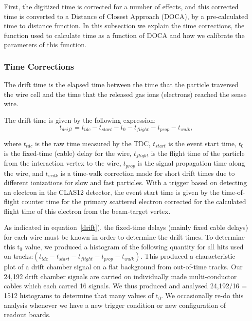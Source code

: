 First, the digitized time is corrected for a number
of effects, and this corrected time is converted to a Distance of Closest Approach (DOCA), by 
a pre-calculated time to distance function.  In this subsection we 
explain the time corrections, the function used to calculate time as a 
function of DOCA and how we calibrate the parameters of this function.

\subsubsection{Time Corrections}
The drift time is the elapsed time between the time that the particle 
traversed the wire cell and the time that the released gas ions (electrons)
reached the sense wire.

The drift time is given by the following expression:
\begin{equation} 
\label{drift}
t_{drift} = t_{tdc} - t_{start} - t_{0} - t_{flight} - t_{prop} - t_{walk},
\end{equation}

\noindent
where $t_{tdc}$ is the raw time measured by the TDC, $t_{start}$ is the event start time, 
$t_0$ is the fixed-time (cable) delay for the wire, $t_{flight}$ is the 
flight time of the particle from the interaction vertex to the wire, $t_{prop}$ 
is the signal propagation time along the wire, and $t_{walk}$ is a time-walk 
correction made for short drift times due to different ionizations for slow 
and fast particles.  
With a trigger based on detecting an electron in the CLAS12 detector, the event start time is 
given by the time-of-flight counter time for the primary scattered electron 
corrected for the calculated flight time of this electron from the beam-target vertex.

As indicated in equation~\ref{drift}), the fixed-time delays (mainly fixed cable delays) 
for each wire must be known in order to determine the drift times.   To determine
this t$_0$ value, we produced a histogram of the following quantity for all hits
used on tracks:$ ( t_{tdc} - t_{start} - t_{flight} - t_{prop} - t_{walk} )$.
This produced a characteristic plot of a drift chamber signal on a flat
background from out-of-time tracks.  Our 24,192 drift chamber signals are carried
on individually made multi-conductor cables which each carred 16 signals.  We thus
produced and analysed 24,192/16 = 1512 histograms to determine that many values of
t$_0$. We occasionally re-do this analysis whenever we have a new trigger condition
or new configuration of readout boards.


